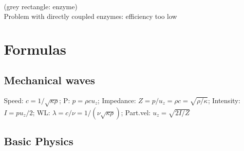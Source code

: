 \documentclass[9pt]{article}
\begin{document}
\begin{multicols}{2}
 (grey rectangle: enzyme)\\
 Problem with directly coupled enzymes: efficiency too low






	
	
	\section{Formulas}                 
\subsection{Mechanical waves}
Speed: $c = 1/\sqrt{\kappa\rho}$; P: $p = \rho c u_z$;
Impedance: $Z = p/u_z = \rho c = \sqrt{\rho/\kappa}$; Intensity: $I = p u_z/2$; WL: $\lambda = {c/\nu} = {1/(\nu \sqrt{\kappa \rho})}$; Part.vel: $u_z=\sqrt{2I/Z}$

\subsection{Basic Physics}


\end{multicols}
\end{document}
